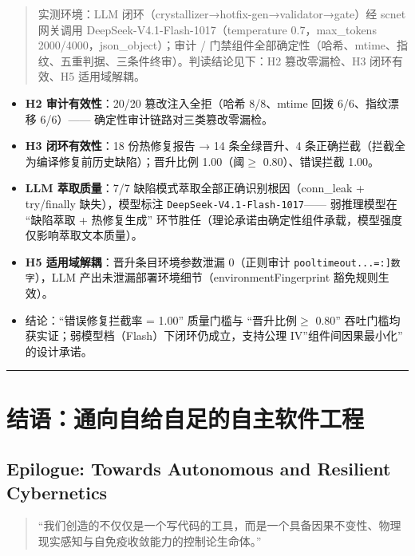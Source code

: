\begin{quote}
实测环境：LLM 闭环（crystallizer→hotfix-gen→validator→gate）经 scnet
网关调用 DeepSeek-V4.1-Flash-1017（temperature 0.7，max\_tokens
2000/4000，json\_object）；审计 /
门禁组件全部确定性（哈希、mtime、指纹、五重判据、三条件终审）。判读结论见下：H2
篡改零漏检、H3 闭环有效、H5 适用域解耦。
\end{quote}

\begin{itemize}
\item
  \textbf{H2 审计有效性}：20/20 篡改注入全拒（哈希 8/8、mtime 回拨
  6/6、指纹漂移 6/6）------ 确定性审计链路对三类篡改零漏检。
\item
  \textbf{H3 闭环有效性}：18 份热修复报告 → 14 条全绿晋升、4
  条正确拦截（拦截全为编译修复前历史缺陷）；晋升比例 1.00（阈\(\ge\)
  0.80）、错误拦截 1.00。
\item
  \textbf{LLM 萃取质量}：7/7 缺陷模式萃取全部正确识别根因（conn\_leak +
  try/finally 缺失），模型标注 \texttt{DeepSeek-V4.1-Flash-1017}------
  弱推理模型在 ``缺陷萃取 + 热修复生成''
  环节胜任（理论承诺由确定性组件承载，模型强度仅影响萃取文本质量）。
\item
  \textbf{H5 适用域解耦}：晋升条目环境参数泄漏 0（正则审计
  \texttt{pool\textbar{}timeout\textbar{}...\textbar{}{[}=:{]}数字}），LLM
  产出未泄漏部署环境细节（environmentFingerprint 豁免规则生效）。
\item
  结论：``错误修复拦截率 = 1.00'' 质量门槛与 ``晋升比例\(\ge\) 0.80''
  吞吐门槛均获实证；弱模型档（Flash）下闭环仍成立，支持公理
  IV''组件间因果最小化'' 的设计承诺。
\end{itemize}

\begin{center}\rule{0.5\linewidth}{0.5pt}\end{center}

\section{结语：通向自给自足的自主软件工程}\label{ux7ed3ux8bedux901aux5411ux81eaux7ed9ux81eaux8db3ux7684ux81eaux4e3bux8f6fux4ef6ux5de5ux7a0b}

\subsection{Epilogue: Towards Autonomous and Resilient
Cybernetics}\label{epilogue-towards-autonomous-and-resilient-cybernetics}

\begin{quote}
``我们创造的不仅仅是一个写代码的工具，而是一个具备因果不变性、物理现实感知与自免疫收敛能力的控制论生命体。''
\end{quote}

